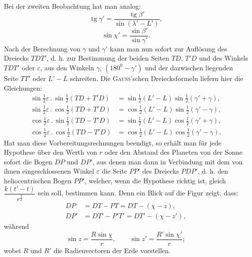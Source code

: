 Bei der zweiten Beobachtung hat man analog:
\begin{equation*}\operatorname{tg}\gamma'=\frac{\operatorname{tg}\beta'}{\sin(\lambda'-L')},\tag*{(3)}\end{equation*}
\begin{equation*}\sin\chi'=\frac{\sin\beta'}{\sin\gamma'}.\tag*{(4)}\end{equation*}
\noindent\hspace*{\parindent}Nach der Berechnung von $\gamma$ und $\gamma'$ kann man nun sofort zur Auflösung des Dreiecks $TDT'$, d. h. zur Bestimmung der beiden Seiten $TD$, $T'D$ und des Winkels $TDT'$ oder $\varepsilon$, aus den Winkeln $\gamma$, $(180^0-\gamma')$ und der dazwischen liegenden Seite $TT'$ oder $L'-L$ schreiten. Die \textsc{Gauss}’schen Dreiecksformeln liefern hier die Gleichungen:
\begin{align*}
\sin\tfrac12\varepsilon\mathbin{.}\sin\tfrac12(TD+T'D)&=\sin\tfrac12(L'-L)\sin\tfrac12(\gamma'+\gamma),\tag*{(5)}\\
\sin\tfrac12\varepsilon\mathbin{.}\cos\tfrac12(TD+T'D)&=\cos\tfrac12(L'-L)\sin\tfrac12(\gamma'-\gamma),\tag*{(6)}\\
\cos\tfrac12\varepsilon\mathbin{.}\sin\tfrac12(TD-T'D)&=\sin\tfrac12(L'-L)\cos\tfrac12(\gamma'+\gamma),\tag*{(7)}\\
\cos\tfrac12\varepsilon\mathbin{.}\cos\tfrac12(TD-T'D)&=\cos\tfrac12(L'-L)\cos\tfrac12(\gamma'-\gamma).\tag*{(8)}
\end{align*}
\noindent\hspace*{\parindent}Hat man diese Vorbereitungsrechnungen beendigt, so erhält man für jede Hypothese über den Werth von $r$ oder den Abstand des Planeten von der Sonne sofort die Bogen $DP$ und $DP'$, aus denen man dann in
\clearpage
{}
\noindent Verbindung mit dem von ihnen eingeschlossenen Winkel $\varepsilon$ die Seite $PP'$ des Dreiecks $PDP'$, d. h. den heliocentrischen Bogen $PP'$, welcher, wenn die Hypothese richtig ist, gleich $\dfrac{k(t'-t)}{r^{\frac32}}$ sein soll, bestimmen kann. Denn ein Blick auf die Figur zeigt, dass:
\begin{align*}
DP&=DT-PT=DT-(\chi-z),\tag*{(9)}\\
DP'&=DT'-P'T'=DT'-(\chi-z'),\tag*{(10)}
\end{align*}
\noindent während
\[
\sin z=\frac{R\sin\chi}{r},\qquad\sin z'=\frac{R'\sin\chi'}{r};
\]
\noindent wobei $R$ und $R'$ die Radienvectoren der Erde vorstellen.

